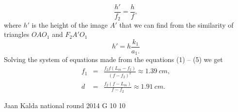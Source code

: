 \documentclass[11pt]{article}
\begin{document}
{\begin{equation}
\frac{h'}{f_{2}}=\frac{h}{f},
\end{equation}
where $h'$ is the height of the image $A'$ that we can find from the similarity of triangles $OAO_{1}$ and $F_{2}A'O_{1}$
\begin{equation}
h'=h\frac{k_{1}}{a_{1}.}\label{2017-v3g-08-eq:telelens-eq2}
\end{equation}
Solving the system of equations made from the equations (1) – (5) we get
\begin{eqnarray*}
f_{1} & = & \frac{f_{2}f(L_{m}-f_{2})}{\left(f-f_{2}\right)^{2}}\approx\SI{1.39}{cm},\\
d & = & \frac{f_{2}(f-L_{m})}{f-f_{2}}\approx\SI{1.91}{cm}.
\end{eqnarray*}
\fi
}

{Jaan Kalda} %
{national round} %
{2014} %
{G 10} %
{10} %
\end{document}
